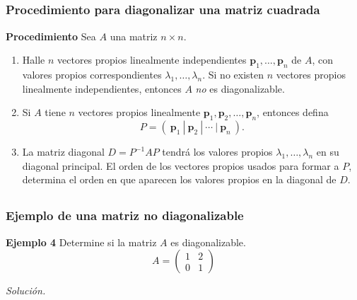 \subsection{}

\begin{frame}\frametitle{Procedimiento para diagonalizar una matriz cuadrada}
	
	\begin{ejem}{\textbf{Procedimiento}}\justifying
		\justifying
		Sea $A$ una matriz $n\times n$. 
		\begin{enumerate}\justifying
			\item Halle $n$ vectores propios linealmente independientes $\mathbf{p}_1,\hdots,\mathbf{p}_n$ de $A$,
			con valores propios correspondientes $\lambda_1,\hdots,\lambda_n$. Si no existen $n$ vectores 
			propios linealmente independientes, entonces $A$ \textit{no} es diagonalizable.
			\item Si $A$ tiene $n$ vectores propios linealmente $\mathbf{p}_1,\mathbf{p}_2,\hdots,\mathbf{p}_n$,
			entonces defina
			\[
				P = (\ \mathbf{p}_1 \ | \ \mathbf{p}_2 \ | \ \cdots \ | \ \mathbf{p}_n \ ).
			\]
			\item La matriz diagonal $D=P^{-1}AP$ tendrá los valores propios $\lambda_1,\hdots,\lambda_n$
			en su diagonal principal. El orden de los vectores propios usados para formar a $P$, determina
			el orden en que aparecen los valores propios en la diagonal de $D$.
		\end{enumerate}
	\end{ejem}		
	
\end{frame}


\subsection{}

\begin{frame}\frametitle{Ejemplo de una matriz no diagonalizable}
	
	\begin{ej}{\textbf{Ejemplo 4}}
		Determine si la matriz $A$ es diagonalizable.
		\[
		A =
		\left(
		\begin{array}{rr}
		1 & 2 \\[1mm]
		0 & 1
		\end{array}
		\right)
		\]	
	\end{ej}
	\textit{Solución.}
	
\end{frame}

